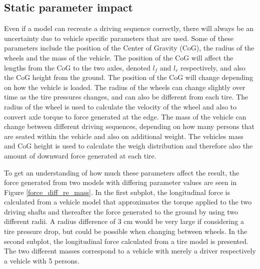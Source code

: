 \subsection{Static parameter impact} 
Even if a model can recreate a driving sequence correctly, there will always be an uncertainty due to vehicle specific parameters that are used. Some of these parameters include the position of the Center of Gravity (CoG), the radius of the wheels and the mass of the vehicle. The position of the CoG will affect the lengths from the CoG to the two axles, denoted $ l_{f} $ and $ l_{r} $ respectively, and also the CoG height from the ground. The position of the CoG will change depending on how the vehicle is loaded. The radius of the wheels can change slightly over time as the tire pressures changes, and can also be different from each tire. The radius of the wheel is used to calculate the velocity of the wheel and also to convert axle torque to force generated at the edge. The mass of the vehicle can change between different driving sequences, depending on how many persons that are seated within the vehicle and also on additional weight. The vehicles mass and CoG height is used to calculate the weigh distribution and therefore also the amount of downward force generated at each tire. 

To get an understanding of how much these parameters affect the result, the force generated from two models with differing parameter values are seen in Figure \ref{force_diff_re_mass}. In the first subplot, the longitudinal force is calculated from a vehicle model that approximates the torque applied to the two driving shafts and thereafter the force generated to the ground by using two different radii. A radius difference of $ 3 $ cm would be very large if considering a tire pressure drop, but could be possible when changing between wheels. In the second subplot, the longitudinal force calculated from a tire model is presented. The two different masses correspond to a vehicle with merely a driver respectively a vehicle with 5 persons. 

